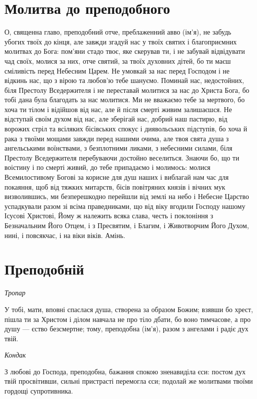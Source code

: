 \documentclass[chapters.tex]{subfiles}
\begin{document}
\section{Молитва до преподобного}
О, священна главо, преподобний отче, преблаженний авво (ім’я), не забудь убогих твоїх до кінця, але завжди згадуй нас у твоїх святих і благоприємних молитвах до Бога: пом’яни стадо твоє, яке скерував ти, і не забувай відвідувати чад своїх, молися за них, отче святий, за твоїх духовних дітей, бо ти маєш сміливість перед Небесним Царем. Не умовкай за нас перед Господом і не відкинь нас, що з вірою та любов’ю тебе шануємо. Поминай нас, недостойних, біля Престолу Вседержителя і не переставай молитися за нас до Христа Бога, бо тобі дана була благодать за нас молитися. Ми не вважаємо тебе за мертвого, бо хоча ти тілом і відійшов від нас, але й після смерті живим залишаєшся. Не відступай своїм духом від нас, але зберігай нас, добрий наш пастирю, від ворожих стріл та всіляких бісівських спокус і диявольських підступів, бо хоча й рака з твоїми мощами завжди перед нашими очима, але твоя свята душа з ангельськими воїнствами, з безплотними ликами, з небесними силами, біля Престолу Вседержителя перебуваючи достойно веселиться. Знаючи бо, що ти воістину і по смерті живий, до тебе припадаємо і молимось: молися Всемилостивому Богові за корисне для душ наших і виблагай нам час для покаяння, щоб від тяжких митарств, бісів повітряних князів і вічних мук визволившись, ми безперешкодно перейшли від землі на небо і Небесне Царство успадкували разом зі всіма праведниками, що від віку вгодили Господу нашому Ісусові Христові, Йому ж належить всяка слава, честь і поклоніння з Безначальним Його Отцем, і з Пресвятим, і Благим, і Животворчим Його Духом, нині, і повсякчас, і на віки віків. Амінь.

\section{Преподобній}
\emph{Тропар}

У тобі, мати, вповні спаслася душа, створена за образом Божим; взявши бо хрест, пішла ти за Христом і ділом навчала не про тіло дбати, бо воно тимчасове, а про душу — єство безсмертне; тому, преподобна (ім’я), разом з ангелами і радіє дух твій.

\emph{Кондак}

З любові до Господа, преподобна, бажання спокою зненавиділа єси: постом дух твій просвітивши, сильні пристрасті перемогла єси; подолай же молитвами твоїми гордощі супротивника.
\end{document}
